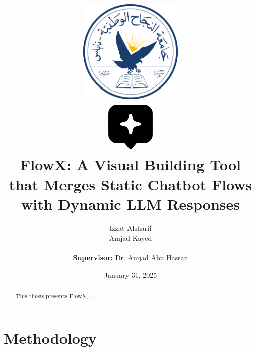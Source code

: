 \documentclass[12pt, a4paper]{report}
\title{
    \includegraphics[height=5cm]{assets/NNU_Logo.png} \\[1cm]
    \includegraphics[height=2.5cm]{assets/FlowX_Logo.png} \\[1cm]
    FlowX: A Visual Building Tool that Merges Static Chatbot Flows with Dynamic LLM Responses
}
\author{
    Izzat Alsharif \\
    Amjad Kayed
    \\\\
    \textbf{Supervisor:} Dr. Amjad Abu Hassan
}
\date{January 31, 2025}
\begin{document}
\maketitle
\tableofcontents
\listoffigures
\listoftables

\begin{abstract}
This thesis presents FlowX, ...
\end{abstract}






\chapter{Methodology}










\renewcommand{\bibname}{References}


\end{document}
